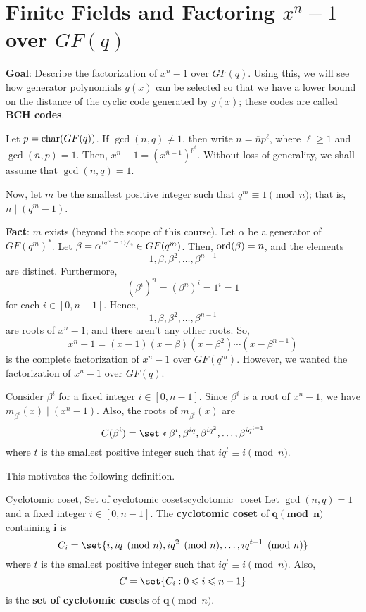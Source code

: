 \section{Finite Fields and Factoring \texorpdfstring{$ x^n-1 $}{xⁿ-1}
  over \texorpdfstring{$ GF(q) $}{GF(q)}}
\textbf{Goal}: Describe the factorization of
$ x^n-1 $ over $ GF(q) $. Using this, we will see how
generator polynomials $ g(x) $ can be selected so that we have a
lower bound on the distance of the cyclic code
generated by $ g(x) $; these codes are called \textbf{BCH codes}.

Let $ p=\operatorname{char}(GF(q)) $. If $ \gcd(n,q)\neq 1 $, then
write $ n=\overline{n}p^\ell $, where $ \ell\geqslant 1 $
and $ \gcd(\overline{n},p)=1 $. Then, $ x^n-1=(x^{\overline{n}-1})^{p^\ell} $.
Without loss of generality, we shall assume that $ \gcd(n,q)=1 $.

Now, let $ m $ be the smallest positive integer such that
$ q^m\equiv 1\pmod{n} $; that is, $ n\mid (q^m-1) $.

\textbf{Fact}: $ m $ exists (beyond the scope of this course).
Let $ \alpha $ be a generator of $ GF(q^m)^* $.
Let $ \beta=\alpha^{\sfrac{(q^m-1)}{n}} \in GF(q^m) $.
Then, $ \operatorname{ord}(\beta)=n $, and the elements
\[ 1,\beta,\beta^2,\ldots ,\beta^{n-1} \]
are distinct. Furthermore,
\[ (\beta^i)^n=(\beta^n)^i=1^i=1 \]
for each $ i\in[0,n-1] $. Hence,
\[ 1,\beta,\beta^2,\ldots ,\beta^{n-1} \]
are roots of $ x^n-1 $; and there aren't any other roots. So,
\[ x^n-1=(x-1)(x-\beta)(x-\beta^2)\cdots(x-\beta^{n-1}) \]
is the complete factorization of $ x^n-1 $ over $ GF(q^m) $.
However, we wanted the factorization of $ x^n-1 $ over $ GF(q) $.

Consider $ \beta^i $ for a fixed integer $ i\in[0,n-1] $. Since
$ \beta^i $ is a root of $ x^n-1 $, we have $ m_{\beta^i}(x)\mid (x^n-1) $.
Also, the roots of $ m_{\beta^i}(x) $ are
\[ C(\beta^i)=\set*{\beta^i,\beta^{iq},\beta^{iq^2},\ldots ,\beta^{iq^{t-1}}} \]
where $ t $ is the smallest positive integer such that $ iq^t\equiv i\pmod{n} $.

This motivates the following definition.

\begin{Definition}{Cyclotomic coset, Set of cyclotomic cosets}{cyclotomic_coset}
    Let $ \gcd(n,q)=1 $ and a fixed integer $ i\in[0,n-1] $. The
    \textbf{cyclotomic coset} of $\symbf{q\pmod{n}}$
    containing $\symbf{i}$ is
    \[ C_i=\set{i,iq\pmod{n},iq^2\pmod{n},\ldots ,iq^{t-1}\pmod{n}} \]
    where $ t $ is the smallest positive integer such that $ iq^t\equiv i\pmod{n} $.
    Also,
    \[ C=\set{C_i:0\leqslant i\leqslant n-1} \]
    is the \textbf{set of cyclotomic cosets} of $\symbf{q}\pmod{n}$.
\end{Definition}



